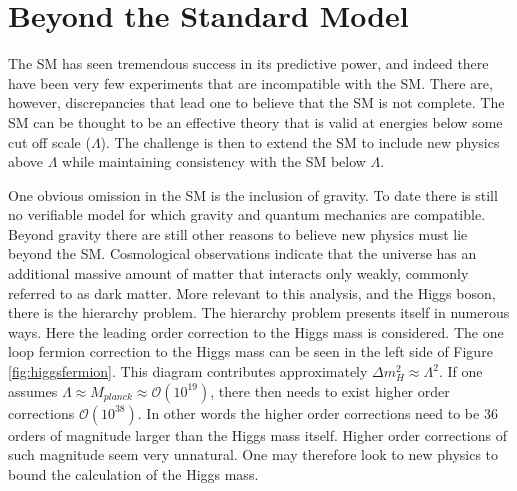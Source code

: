 \section{Beyond the Standard Model}
\label{sec:bsd}

The SM has seen tremendous success in its predictive power, and indeed there have been very few experiments that are incompatible with the SM.
There are, however, discrepancies that lead one to believe that the SM is not complete.
The SM can be thought to be an effective theory that is valid at energies below some cut off scale ($\Lambda$).
The challenge is then to extend the SM to include new physics above $\Lambda$ while maintaining consistency with the SM below $\Lambda$.

One obvious omission in the SM is the inclusion of gravity. 
To date there is still no verifiable model for which gravity and quantum mechanics are compatible.
Beyond gravity there are still other reasons to believe new physics must lie beyond the SM.
Cosmological observations indicate that the universe has an additional massive amount of matter that interacts only weakly, commonly referred to as dark matter.
More relevant to this analysis, and the Higgs boson, there is the hierarchy problem.
The hierarchy problem presents itself in numerous ways. 
Here the leading order correction to the Higgs mass is considered.
The one loop fermion correction to the Higgs mass can be seen in the left side of Figure \ref{fig:higgsfermion}. 
This diagram contributes approximately $\Delta m_{H}^{2} \approx \Lambda^{2}$.
If one assumes $\Lambda \approx M_{planck} \approx \mathcal{O}(10^{19})$, there then needs to exist higher order corrections $\mathcal{O}(10^{38})$. 
In other words the higher order corrections need to be 36 orders of magnitude larger than the Higgs mass itself.
Higher order corrections of such magnitude seem very unnatural.
One may therefore look to new physics to bound the calculation of the Higgs mass.
